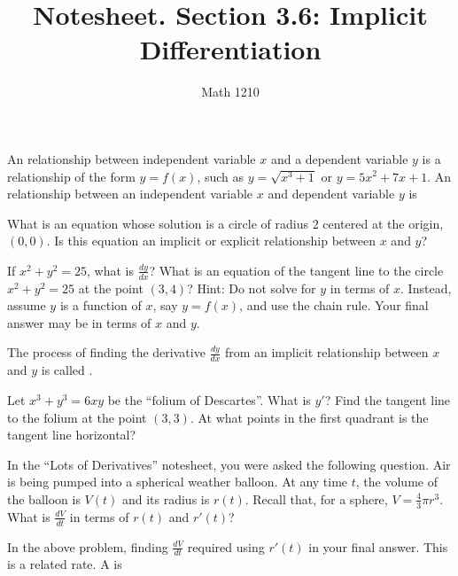 \documentclass[12pt, a4paper]{article}
\author{Math 1210}
\title{Notesheet. Section 3.6: Implicit Differentiation}
\date{}
\begin{document}
\maketitle
\nameline
\begin{defi}
  An  relationship between independent variable \(x\) and
  a dependent variable \(y\) is a relationship of the form \(y = f(x)\), such as \(y
  = \sqrt{x^3+1}\) or \(y = 5x^2+7x+1\). An  relationship
  between an independent variable \(x\) and dependent variable \(y\) is
\end{defi}
\begin{ex}
  What is an equation whose solution is a circle of radius \(2\)
  centered at the origin, \((0,0)\). Is this equation an implicit or
  explicit relationship between \(x\) and \(y\)?
\end{ex}
\begin{ex}
  If \(x^2 + y^2 = 25\), what is \(\frac{dy}{dx}\)? What is an
  equation of the tangent line to the circle \(x^2+y^2=25\) at the
  point \((3,4)\)? Hint: Do not solve for \(y\) in terms of
  \(x\). Instead, assume \(y\)
  is a function of \(x\), say \(y = f(x)\), and use the chain
  rule. Your final answer may be in terms of \(x\) and \(y\).
\end{ex}
\vspace{-0.5in}
\begin{defi}
  The process of finding the derivative \(\frac{dy}{dx}\) from an
  implicit relationship between \(x\) and \(y\) is called .
\end{defi}
\begin{ex}
  Let \(x^3 + y^3 = 6xy\) be the ``folium of Descartes''. What is \(y'\)? Find the tangent line to
  the folium at the
  point \((3,3)\). At what points in the first quadrant is the tangent
  line horizontal?
\end{ex}
\begin{ex}
  In the ``Lots of Derivatives'' notesheet, you were asked the
  following question. Air is being pumped into a spherical weather
  balloon. At any time
  \(t\), the volume of the balloon is \(V(t)\) and its radius is
  \(r(t)\). Recall that, for a sphere, \(V = \frac{4}{3} \pi
  r^3\). What is \(\frac{dV}{dt}\) in terms of \(r(t)\) and
  \(r'(t)\)?
\end{ex}
\begin{defi}
  In the above problem, finding \(\frac{dV}{dt}\) required using \(r'(t)\) in
  your final answer. This is a related rate. A  is
\end{defi}
\end{document}
